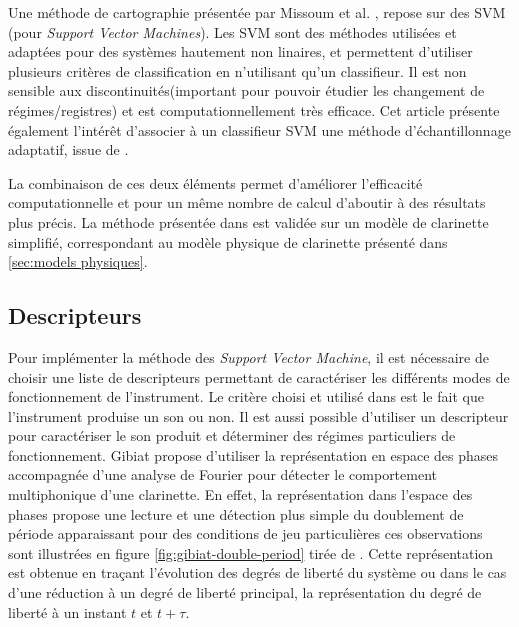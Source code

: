 \documentclass[atiam, article]{rapport} %
\begin{document}
Une méthode de cartographie présentée par Missoum et al. \cite{missoum_explicit_2014}, repose sur des SVM (pour \textit{Support Vector Machines}). 
Les SVM sont des méthodes utilisées et adaptées pour des systèmes hautement non linaires, et permettent d'utiliser plusieurs critères de classification en n'utilisant qu'un classifieur. Il est non sensible aux discontinuités(important pour pouvoir étudier les changement de régimes/registres) et est computationnellement très efficace. Cet article présente également l'intérêt d'associer à un classifieur SVM une méthode d'échantillonnage  adaptatif, issue de \cite{basudhar2010improved}. 

La combinaison de ces deux éléments permet d'améliorer l'efficacité computationnelle et pour un même nombre de calcul d'aboutir à des résultats plus précis. La méthode présentée dans \cite{missoum_explicit_2014} est validée sur un modèle de clarinette simplifié, correspondant au modèle physique de clarinette présenté dans \ref{sec:models physiques}.


\subsection{Descripteurs}

Pour implémenter la méthode des \textit{Support Vector Machine}, il est nécessaire de choisir une liste de descripteurs permettant de caractériser les différents modes de fonctionnement de l'instrument. 
Le critère choisi et utilisé dans \cite{missoum_explicit_2014} est le fait que l'instrument produise un son ou non. 
Il est aussi possible d'utiliser un descripteur pour caractériser le son produit et déterminer des régimes particuliers de fonctionnement. 
Gibiat \cite{gibiat_phase_1988} propose d'utiliser la représentation en espace des phases accompagnée d'une analyse de Fourier pour détecter le comportement multiphonique d'une clarinette. 
En effet, la représentation dans l'espace des phases propose une lecture et une détection plus simple du doublement de période apparaissant pour des conditions de jeu particulières ces observations sont illustrées en figure \ref{fig:gibiat-double-period} tirée de \cite{gibiat_phase_1988}. 
Cette représentation est obtenue en traçant l'évolution des degrés de liberté du système ou dans le cas d'une réduction à un degré de liberté principal, la représentation du degré de liberté à un instant $t$ et $t + \tau$. 
\end{document}
